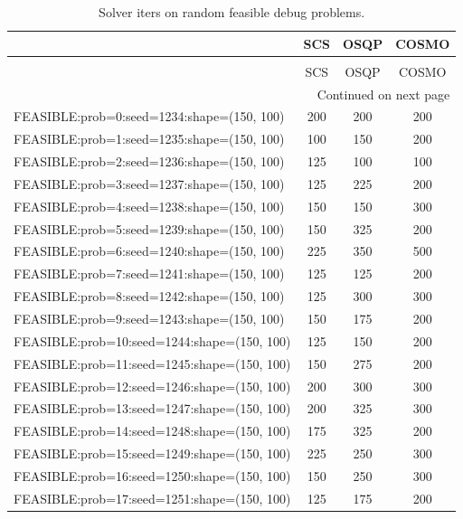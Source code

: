 \begin{longtable}{lccc}
\caption{Solver iters on random feasible debug problems.}
\label{t-random feasible debug-iters}\\
\toprule
{} &  SCS &  OSQP &  COSMO \\
\midrule
\endfirsthead
\caption[]{Solver iters on random feasible debug problems.} \\
\toprule
{} &  SCS &  OSQP &  COSMO \\
\midrule
\endhead
\midrule
\multicolumn{4}{r}{{Continued on next page}} \\
\midrule
\endfoot

\bottomrule
\endlastfoot
FEASIBLE:prob=0:seed=1234:shape=(150, 100)   &  200 &   200 &    200 \\
FEASIBLE:prob=1:seed=1235:shape=(150, 100)   &  100 &   150 &    200 \\
FEASIBLE:prob=2:seed=1236:shape=(150, 100)   &  125 &   100 &    100 \\
FEASIBLE:prob=3:seed=1237:shape=(150, 100)   &  125 &   225 &    200 \\
FEASIBLE:prob=4:seed=1238:shape=(150, 100)   &  150 &   150 &    300 \\
FEASIBLE:prob=5:seed=1239:shape=(150, 100)   &  150 &   325 &    200 \\
FEASIBLE:prob=6:seed=1240:shape=(150, 100)   &  225 &   350 &    500 \\
FEASIBLE:prob=7:seed=1241:shape=(150, 100)   &  125 &   125 &    200 \\
FEASIBLE:prob=8:seed=1242:shape=(150, 100)   &  125 &   300 &    300 \\
FEASIBLE:prob=9:seed=1243:shape=(150, 100)   &  150 &   175 &    200 \\
FEASIBLE:prob=10:seed=1244:shape=(150, 100)  &  125 &   150 &    200 \\
FEASIBLE:prob=11:seed=1245:shape=(150, 100)  &  150 &   275 &    200 \\
FEASIBLE:prob=12:seed=1246:shape=(150, 100)  &  200 &   300 &    300 \\
FEASIBLE:prob=13:seed=1247:shape=(150, 100)  &  200 &   325 &    300 \\
FEASIBLE:prob=14:seed=1248:shape=(150, 100)  &  175 &   325 &    200 \\
FEASIBLE:prob=15:seed=1249:shape=(150, 100)  &  225 &   250 &    300 \\
FEASIBLE:prob=16:seed=1250:shape=(150, 100)  &  150 &   250 &    300 \\
FEASIBLE:prob=17:seed=1251:shape=(150, 100)  &  125 &   175 &    200 \\

\end{longtable}
